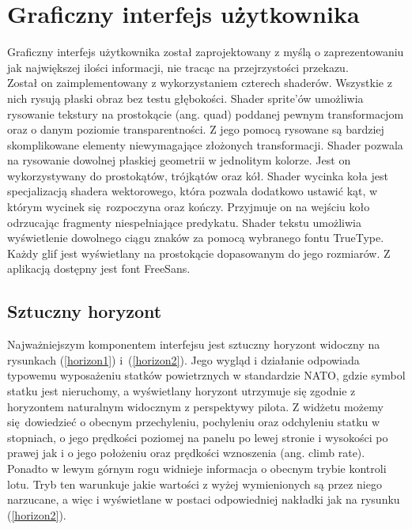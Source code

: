 \section{Graficzny interfejs użytkownika}

Graficzny interfejs użytkownika został zaprojektowany z myślą o zaprezentowaniu jak największej ilości informacji, nie tracąc na przejrzystości przekazu.
\\

Został on zaimplementowany z wykorzystaniem czterech shaderów. Wszystkie z nich rysują płaski obraz bez testu głębokości. Shader sprite'ów umożliwia rysowanie tekstury na prostokącie (ang. quad) poddanej pewnym transformacjom oraz o danym poziomie transparentności. Z jego pomocą rysowane są bardziej skomplikowane elementy niewymagające złożonych transformacji. Shader pozwala na rysowanie dowolnej płaskiej geometrii w jednolitym kolorze. Jest on wykorzystywany do prostokątów, trójkątów oraz kół. Shader wycinka koła jest specjalizacją shadera wektorowego, która pozwala dodatkowo ustawić kąt, w którym wycinek się rozpoczyna oraz kończy. Przyjmuje on na wejściu koło odrzucając fragmenty niespełniające predykatu. Shader tekstu umożliwia wyświetlenie dowolnego ciągu znaków za pomocą wybranego fontu TrueType. Każdy glif jest wyświetlany na prostokącie dopasowanym do jego rozmiarów. Z aplikacją dostępny jest font FreeSans.

\subsection{Sztuczny horyzont}

Najważniejszym komponentem interfejsu jest sztuczny horyzont widoczny na rysunkach (\ref{horizon1}) i~(\ref{horizon2}). Jego wygląd i działanie odpowiada typowemu wyposażeniu statków powietrznych w standardzie NATO, gdzie symbol statku jest nieruchomy, a wyświetlany horyzont utrzymuje się zgodnie z horyzontem naturalnym widocznym z perspektywy pilota. Z widżetu możemy się dowiedzieć o obecnym przechyleniu, pochyleniu oraz odchyleniu statku w stopniach, o jego prędkości poziomej na panelu po lewej stronie i wysokości po prawej jak i o jego położeniu oraz prędkości wznoszenia (ang. climb rate). Ponadto w lewym górnym rogu widnieje informacja o obecnym trybie kontroli lotu. Tryb ten warunkuje jakie wartości z wyżej wymienionych są przez niego narzucane, a więc i wyświetlane w postaci odpowiedniej nakładki jak na rysunku (\ref{horizon2}).




